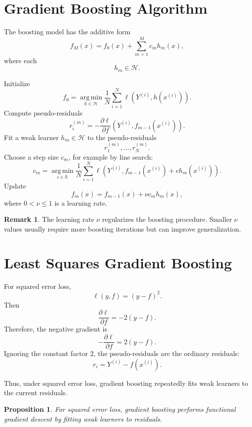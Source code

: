 \documentclass[12pt,oneside]{book}
\numberwithin{equation}{section}
\theoremstyle{definition}
\newtheorem{remark}{Remark}[section]
\theoremstyle{plain}
\newtheorem{proposition}{Proposition}[section]
\theoremstyle{remark}
\newcommand{\R}{\mathbb{R}}
\newcommand{\argmin}{\operatorname*{arg\,min}}
\begin{document}
\section{Gradient Boosting Algorithm}

The boosting model has the additive form
\[
f_M(x)
=
f_0(x)+\sum_{m=1}^M c_m h_m(x),
\]
where each
\[
h_m\in\mathcal{H}.
\]

\begin{algorithm}[H]
\caption{Gradient Boosting}
\begin{algorithmic}[1]
\State Initialize
\[
f_0=\argmin_{h\in\mathcal{H}} \frac{1}{N}\sum_{i=1}^N \ell(Y^{(i)},h(x^{(i)})).
\]
    \State Compute pseudo-residuals
    \[
    r_i^{(m)}
    =
    -
    \frac{\partial \ell}{\partial f}
    (Y^{(i)},f_{m-1}(x^{(i)})).
    \]
    \State Fit a weak learner $h_m\in\mathcal{H}$ to the pseudo-residuals
    \[
    r_1^{(m)},\ldots,r_N^{(m)}.
    \]
    \State Choose a step size $c_m$, for example by line search:
    \[
    c_m
    =
    \argmin_{c\in\R}
    \frac{1}{N}\sum_{i=1}^N
    \ell(Y^{(i)},f_{m-1}(x^{(i)})+c h_m(x^{(i)})).
    \]
    \State Update
    \[
    f_m(x)=f_{m-1}(x)+\nu c_m h_m(x),
    \]
    where $0<\nu\le 1$ is a learning rate.
\EndFor
\end{algorithmic}
\end{algorithm}

\begin{remark}
The learning rate $\nu$ regularizes the boosting procedure. Smaller $\nu$ values usually require more boosting iterations but can improve generalization.
\end{remark}

\section{Least Squares Gradient Boosting}

For squared error loss,
\[
\ell(y,f)=(y-f)^2.
\]
Then
\[
\frac{\partial \ell}{\partial f}
=
-2(y-f).
\]
Therefore, the negative gradient is
\[
-\frac{\partial \ell}{\partial f}
=
2(y-f).
\]
Ignoring the constant factor $2$, the pseudo-residuals are the ordinary residuals:
\[
r_i
=
Y^{(i)}-f(x^{(i)}).
\]

Thus, under squared error loss, gradient boosting repeatedly fits weak learners to the current residuals.

\begin{proposition}
For squared error loss, gradient boosting performs functional gradient descent by fitting weak learners to residuals.
\end{proposition}
\end{document}
